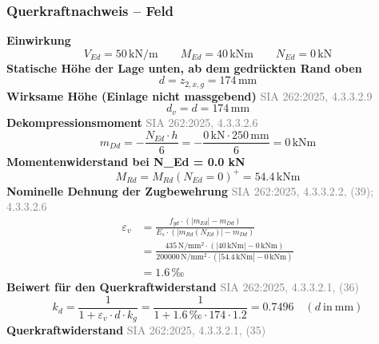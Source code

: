 \documentclass[11pt,a4paper]{article}
\newcommand{\normref}[1]{{\small\textcolor{gray}{#1}}}
\begin{document}
\subsubsection{Querkraftnachweis – Feld}
\noindent\textbf{Einwirkung}
\begin{equation*}
V_{Ed} = 50\,\mathrm{kN}/\mathrm{m} \qquad M_{Ed} = 40\,\mathrm{kNm} \qquad N_{Ed} = 0\,\mathrm{kN}
\end{equation*}
\noindent\textbf{Statische Höhe der Lage unten, ab dem gedrückten Rand oben}
\begin{equation*}
d = z_{2,x,g} = 174\,\mathrm{mm}
\end{equation*}
\noindent\textbf{Wirksame Höhe (Einlage nicht massgebend)} \hfill \normref{SIA 262:2025, 4.3.3.2.9}
\begin{equation*}
d_v = d = 174\,\mathrm{mm}
\end{equation*}
\noindent\textbf{Dekompressionsmoment} \hfill \normref{SIA 262:2025, 4.3.3.2.6}
\begin{equation*}
m_{Dd} = -\frac{N_{Ed} \cdot h}{6} = -\frac{0\,\mathrm{kN} \cdot 250\,\mathrm{mm}}{6} = 0\,\mathrm{kNm}
\end{equation*}
\noindent\textbf{Momentenwiderstand bei N\_Ed = 0.0 kN}
\begin{equation*}
M_{Rd} = M_{Rd}(N_{Ed}=0)^{+} = 54.4\,\mathrm{kNm}
\end{equation*}
\noindent\textbf{Nominelle Dehnung der Zugbewehrung} \hfill \normref{SIA 262:2025, 4.3.3.2.2, (39); 4.3.3.2.6}
\begin{equation*}
\begin{aligned}
  \varepsilon_v &= \frac{f_{yd} \cdot \left(\left|m_{Ed}\right| - m_{Dd}\right)}{E_s \cdot \left(\left|m_{Rd}(N_{Ed})\right| - m_{Dd}\right)} \\
  &= \frac{435\,\mathrm{N}/\mathrm{mm}^{2} \cdot \left(\left|40\,\mathrm{kNm}\right| - 0\,\mathrm{kNm}\right)}{200000\,\mathrm{N}/\mathrm{mm}^{2} \cdot \left(\left|54.4\,\mathrm{kNm}\right| - 0\,\mathrm{kNm}\right)} \\
  &= 1.6\,\text{‰}
\end{aligned}
\end{equation*}
\noindent\textbf{Beiwert für den Querkraftwiderstand} \hfill \normref{SIA 262:2025, 4.3.3.2.1, (36)}
\begin{equation*}
k_d = \frac{1}{1 + \varepsilon_v \cdot d \cdot k_g} = \frac{1}{1 + 1.6\,\text{‰} \cdot 174 \cdot 1.2} = 0.7496 \quad \left(d\ \text{in}\ \mathrm{mm}\right)
\end{equation*}
\noindent\textbf{Querkraftwiderstand} \hfill \normref{SIA 262:2025, 4.3.3.2.1, (35)}
\end{document}
